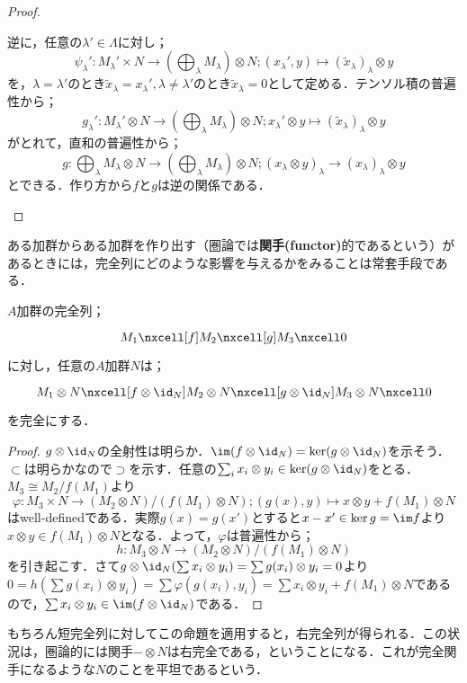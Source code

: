 \begin{proof}
\begin{step}
	逆に，任意の$\lambda'\in\Lambda$に対し；
	\[\psi_\lambda':M_\lambda'\times N\to\left(\bigoplus_\lambda M_\lambda\right)\otimes N;(x_\lambda',y)\mapsto(\tilde{x}_\lambda)_\lambda\otimes y\]
	を，$\lambda=\lambda'$のとき$\tilde{x}_\lambda=x_\lambda',\lambda\neq\lambda'$のとき$\tilde{x}_\lambda=0$として定める．テンソル積の普遍性から；
	\[g_\lambda':M_\lambda'\otimes N\to\left(\bigoplus_\lambda M_\lambda\right)\otimes N;x_\lambda'\otimes y\mapsto(\tilde{x}_\lambda)_\lambda\otimes y\]
	がとれて，直和の普遍性から；
	\[g:\bigoplus_\lambda M_\lambda\otimes N\to \left(\bigoplus_\lambda M_\lambda\right)\otimes N;(x_\lambda\otimes y)_\lambda\to(x_\lambda)_\lambda\otimes y\]
	とできる．作り方から$f$と$g$は逆の関係である．
	\end{step}
\end{proof}

ある加群からある加群を作り出す（圏論では\textbf{関手(functor)}的であるという）があるときには，完全列にどのような影響を与えるかをみることは常套手段である．

\begin{prop}[テンソル積の右完全性]
	$A$加群の完全列；
	\[\begin{tikzcd}
	M_1\nxcell[f]M_2\nxcell[g]M_3\nxcell0
	\end{tikzcd}\]
	に対し，任意の$A$加群$N$は；
	\[\begin{tikzcd}
	M_1\otimes N\nxcell[f\otimes\id_{N}]M_2\otimes N\nxcell[g\otimes\id_{N}]M_3\otimes N\nxcell0
	\end{tikzcd}\]
	を完全にする．
\end{prop}
\begin{proof}
	$g\otimes\id_{N}$の全射性は明らか．$\im(f\otimes\id_{N})=\ker(g\otimes\id_{N})$を示そう．$\subset$は明らかなので$\supset$を示す．任意の$\sum_i x_i\otimes y_i\in\ker(g\otimes\id_{N})$をとる．$M_3\cong M_2/f(M_1)$より
	\[\varphi:M_3\times N\to (M_2\otimes N)/(f(M_1)\otimes N);(g(x),y)\mapsto x\otimes y+f(M_1)\otimes N\]
	はwell-definedである．実際$g(x)=g(x')$とすると$x-x'\in\ker g=\im f$より$x\otimes y\in f(M_1)\otimes N$となる．よって，$\varphi$は普遍性から；
	\[h:M_3\otimes N\to(M_2\otimes N)/(f(M_1)\otimes N)\]
	を引き起こす．さて$g\otimes\id_{N}(\sum x_i\otimes y_i)=\sum g(x_i)\otimes y_i=0$より$0=h(\sum g(x_i)\otimes y_i)=\sum \varphi(g(x_i),y_i)=\sum x_i\otimes y_i+f(M_1)\otimes N$であるので，$\sum x_i\otimes y_i\in\im(f\otimes\id_{N})$である．
\end{proof}
もちろん短完全列に対してこの命題を適用すると，右完全列が得られる．この状況は，圏論的には関手$-\otimes N$は右完全である，ということになる．これが完全関手になるような$N$のことを平坦であるという．

